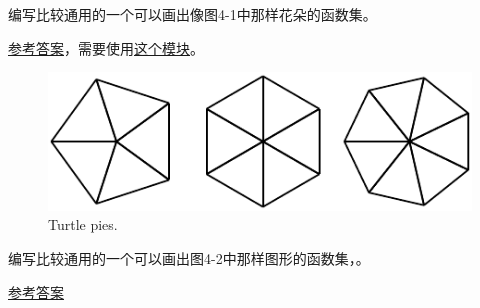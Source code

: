 \begin{exercise}


编写比较通用的一个可以画出像图4-1中那样花朵的函数集。


\href{http://thinkpython2.com/code/flower.py}{参考答案}，需要使用\href{http://thinkpython2.com/code/polygon.py}{这个模块}。

\end{exercise}



\begin{figure}
\centerline
{\includegraphics[scale=0.8]{../source/figs/pies.pdf}}
\caption{Turtle pies.}
\label{fig.pies}
\end{figure}


\begin{exercise}


编写比较通用的一个可以画出图4-2中那样图形的函数集，。


\href{http://thinkpython2.com/code/pie.py}{参考答案}

\end{exercise}

